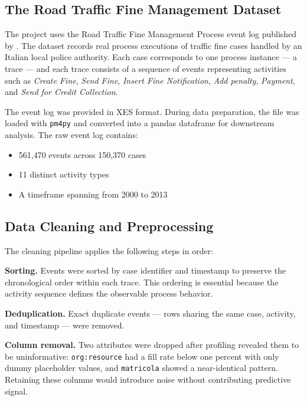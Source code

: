 
\subsection{The Road Traffic Fine Management Dataset}

The project uses the Road Traffic Fine Management Process event log published by \textcite{deleoni2015}. The dataset records real process executions of traffic fine cases handled by an Italian local police authority. Each case corresponds to one process instance — a trace — and each trace consists of a sequence of events representing activities such as \textit{Create Fine}, \textit{Send Fine}, \textit{Insert Fine Notification}, \textit{Add penalty}, \textit{Payment}, and \textit{Send for Credit Collection}.

The event log was provided in XES format. During data preparation, the file was loaded with \texttt{pm4py} and converted into a pandas dataframe for downstream analysis. The raw event log contains:

\begin{itemize}
    \item 561,470 events across 150,370 cases
    \item 11 distinct activity types
    \item A timeframe spanning from 2000 to 2013
\end{itemize}

\subsection{Data Cleaning and Preprocessing}

The cleaning pipeline applies the following steps in order:

\textbf{Sorting.} Events were sorted by case identifier and timestamp to preserve the chronological order within each trace. This ordering is essential because the activity sequence defines the observable process behavior.

\textbf{Deduplication.} Exact duplicate events — rows sharing the same case, activity, and timestamp — were removed.

\textbf{Column removal.} Two attributes were dropped after profiling revealed them to be uninformative: \texttt{org:resource} had a fill rate below one percent with only dummy placeholder values, and \texttt{matricola} showed a near-identical pattern. Retaining these columns would introduce noise without contributing predictive signal.

